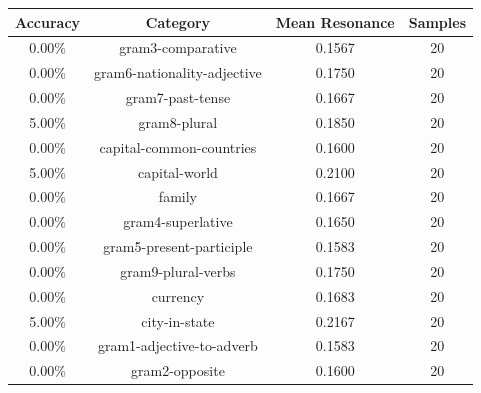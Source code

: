 \begin{table}[h]
\centering
\begin{tabular}{ |c|c|c|c| }
\hline
Accuracy & Category & Mean Resonance & Samples \\
\hline
0.00\% & gram3-comparative & 0.1567 & 20 \\
\hline
0.00\% & gram6-nationality-adjective & 0.1750 & 20 \\
\hline
0.00\% & gram7-past-tense & 0.1667 & 20 \\
\hline
5.00\% & gram8-plural & 0.1850 & 20 \\
\hline
0.00\% & capital-common-countries & 0.1600 & 20 \\
\hline
5.00\% & capital-world & 0.2100 & 20 \\
\hline
0.00\% & family & 0.1667 & 20 \\
\hline
0.00\% & gram4-superlative & 0.1650 & 20 \\
\hline
0.00\% & gram5-present-participle & 0.1583 & 20 \\
\hline
0.00\% & gram9-plural-verbs & 0.1750 & 20 \\
\hline
0.00\% & currency & 0.1683 & 20 \\
\hline
5.00\% & city-in-state & 0.2167 & 20 \\
\hline
0.00\% & gram1-adjective-to-adverb & 0.1583 & 20 \\
\hline
0.00\% & gram2-opposite & 0.1600 & 20 \\
\hline
\end{tabular}
\end{table}
